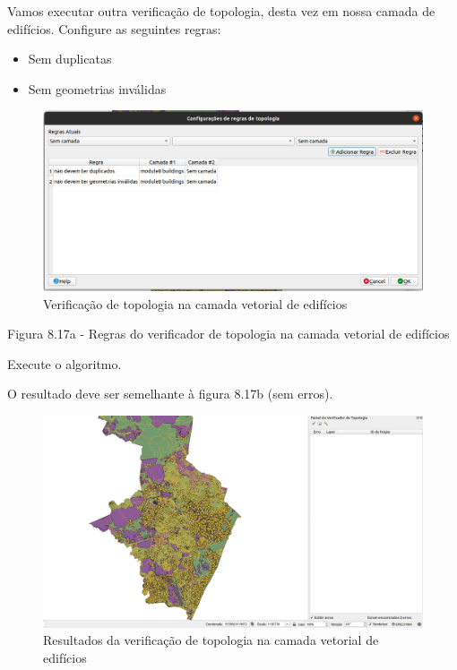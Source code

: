 \documentclass[
  portuguese,
]{krantz}
\providecommand{\tightlist}{%
  \setlength{\itemsep}{0pt}\setlength{\parskip}{0pt}}
\begin{document}
Vamos executar outra verificação de topologia, desta vez em nossa camada de edifícios. Configure as seguintes regras:

\begin{itemize}
\tightlist
\item
  Sem duplicatas
\item
  Sem geometrias inválidas
\end{itemize}

\begin{figure}
\centering
\includegraphics{media/modulo8/fig817_a.png}
\caption{Verificação de topologia na camada vetorial de edifícios}
\end{figure}

Figura 8.17a - Regras do verificador de topologia na camada vetorial de edifícios

Execute o algoritmo.

O resultado deve ser semelhante à figura 8.17b (sem erros).

\begin{figure}
\centering
\includegraphics{media/modulo8/fig817_b.png}
\caption{Resultados da verificação de topologia na camada vetorial de edifícios}
\end{figure}
\end{document}
